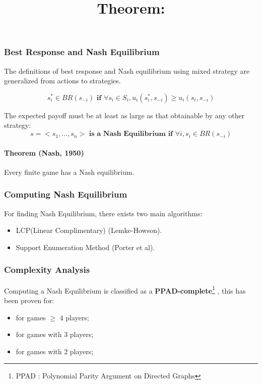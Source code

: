\subsubsection{Best Response and Nash Equilibrium}The definitions of best response and Nash equilibrium using mixed strategy are generalized from actions to strategies. 
\begin{mydef}\label{def:def77}
\begin{equation}\label{eq:111}
s_i^* \in BR(s_{-i}) \textbf{ if }   \forall s_i \in S_i, u_i(s_i^*,s_{-i}) \geq u_i(s_i, s_{-i})
\end{equation}
\end{mydef}
\begin{mydef}\label{def:def88} The expected payoff must be at least as large as that obtainable by any other strategy:
$$s = <s_1,...,s_n>\textbf{ is  a }\textbf{Nash Equilibrium if } \forall i, s_i \in BR(s_{-i})$$
\end{mydef}

\paragraph{Theorem (Nash, 1950)} Every finite game has a Nash equilibrium.

\subsubsection{Computing Nash Equilibrium}
For finding Nash Equilibrium, there exists two main algorithms:
\begin{itemize}
\item LCP(Linear Complimentary) (Lemke-Howson).
\item Support Enumeration Method (Porter et al).
\end{itemize}

\subsubsection{Complexity Analysis}
\title{\textbf{Theorem:}}
Computing a Nash Equilibrium is classified as a \textbf{PPAD-complete}\footnote{PPAD : Polynomial Parity Argument on Directed Graphs} , this has been proven for:
\begin{itemize}
\item for games $\geq$ 4 players;
\item for games with 3 players;
\item for games with 2 players;
\end{itemize}

